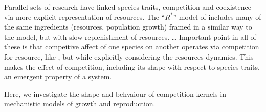 \documentclass[a4paper,11pt]{article}
\newcommand{\Rstar}{\ensuremath{R^*}}
\begin{document}
%
Parallel sets of research have linked species traits, competition and
coexistence via more explicit representation of resources.
%
The ``\Rstar'' model of \citet{Tilman-1982} includes many of the same
ingredients (resources, population growth) framed in a similar way to
the \citet{MacArthur-1967} model, but with slow replenishment of
resources.
\ldots
%
Important point in all of these is that compeitive affect of one
species on another operates via competition for resource, like
\citet{MacArthur-1967}, but while explicitly considering the resources
dynamics.  This makes the effect of competition, including its shape
with respect to species traits, an emergent property of a system.

%
%
Here, we investigate the shape and behvaiour of competition kernels in
mechanistic models of growth and reproduction.
\end{document}
